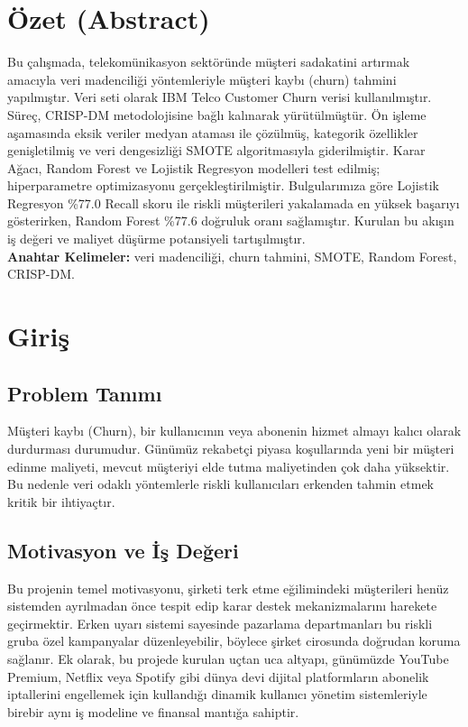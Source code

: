 \documentclass[11pt,a4paper]{article}
\begin{document}
\section*{Özet (Abstract)}
Bu çalışmada, telekomünikasyon sektöründe müşteri sadakatini artırmak amacıyla veri madenciliği yöntemleriyle müşteri kaybı (churn) tahmini yapılmıştır. Veri seti olarak IBM Telco Customer Churn verisi kullanılmıştır. Süreç, CRISP-DM metodolojisine bağlı kalınarak yürütülmüştür. Ön işleme aşamasında eksik veriler medyan ataması ile çözülmüş, kategorik özellikler genişletilmiş ve veri dengesizliği SMOTE algoritmasıyla giderilmiştir. Karar Ağacı, Random Forest ve Lojistik Regresyon modelleri test edilmiş; hiperparametre optimizasyonu gerçekleştirilmiştir. Bulgularımıza göre Lojistik Regresyon \%77.0 Recall skoru ile riskli müşterileri yakalamada en yüksek başarıyı gösterirken, Random Forest \%77.6 doğruluk oranı sağlamıştır. Kurulan bu akışın iş değeri ve maliyet düşürme potansiyeli tartışılmıştır.\\
\textbf{Anahtar Kelimeler:} veri madenciliği, churn tahmini, SMOTE, Random Forest, CRISP-DM.

\section{Giriş}
\subsection{Problem Tanımı}
Müşteri kaybı (Churn), bir kullanıcının veya abonenin hizmet almayı kalıcı olarak durdurması durumudur. Günümüz rekabetçi piyasa koşullarında yeni bir müşteri edinme maliyeti, mevcut müşteriyi elde tutma maliyetinden çok daha yüksektir. Bu nedenle veri odaklı yöntemlerle riskli kullanıcıları erkenden tahmin etmek kritik bir ihtiyaçtır.

\subsection{Motivasyon ve İş Değeri}
Bu projenin temel motivasyonu, şirketi terk etme eğilimindeki müşterileri henüz sistemden ayrılmadan önce tespit edip karar destek mekanizmalarını harekete geçirmektir. Erken uyarı sistemi sayesinde pazarlama departmanları bu riskli gruba özel kampanyalar düzenleyebilir, böylece şirket cirosunda doğrudan koruma sağlanır. Ek olarak, bu projede kurulan uçtan uca altyapı, günümüzde YouTube Premium, Netflix veya Spotify gibi dünya devi dijital platformların abonelik iptallerini engellemek için kullandığı dinamik kullanıcı yönetim sistemleriyle birebir aynı iş modeline ve finansal mantığa sahiptir.
\end{document}
